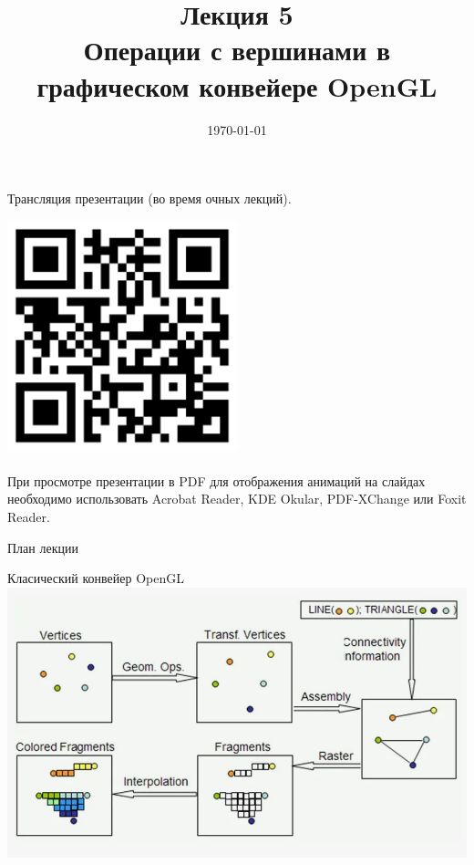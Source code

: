 \documentclass[10pt]{beamer}
\date{\today}
\title{Лекция 5 \\Операции с вершинами в графическом конвейере OpenGL}
\begin{document}
 		 


\everymath{\displaystyle}

    
    \begin{frame}[plain]
    	
    	
    	\centering
    	Трансляция презентации (во время очных лекций).     
    		
    	\includegraphics[width=0.5\textwidth, keepaspectratio]{qr.png} \\ ~ \\
    	
    	
    	При просмотре презентации в PDF для отображения анимаций на слайдах необходимо использовать Acrobat Reader, KDE Okular, PDF-XChange или Foxit Reader.

    \end{frame}
	
	
	\frame{\maketitle}
	
	
	
	\begin{frame}{План лекции}
		\tableofcontents
	\end{frame}
	
	\begin{frame}{Класический конвейер OpenGL}
		\includegraphics[width=\textwidth]{old_pipeline.png}
	\end{frame}
	
\end{document}
